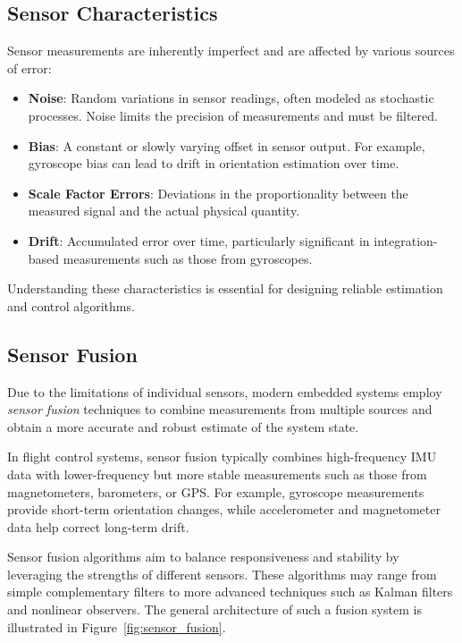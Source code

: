 \subsection{Sensor Characteristics}

Sensor measurements are inherently imperfect and are affected by various sources of error:

\begin{itemize}
    \item \textbf{Noise}:  
    Random variations in sensor readings, often modeled as stochastic processes. Noise limits the precision of measurements and must be filtered.

    \item \textbf{Bias}:  
    A constant or slowly varying offset in sensor output. For example, gyroscope bias can lead to drift in orientation estimation over time.

    \item \textbf{Scale Factor Errors}:  
    Deviations in the proportionality between the measured signal and the actual physical quantity.

    \item \textbf{Drift}:  
    Accumulated error over time, particularly significant in integration-based measurements such as those from gyroscopes.

\end{itemize}

Understanding these characteristics is essential for designing reliable estimation and control algorithms.

\subsection{Sensor Fusion}

Due to the limitations of individual sensors, modern embedded systems employ \textit{sensor fusion} techniques to combine measurements from multiple sources and obtain a more accurate and robust estimate of the system state.

In flight control systems, sensor fusion typically combines high-frequency IMU data with lower-frequency but more stable measurements such as those from magnetometers, barometers, or GPS. For example, gyroscope measurements provide short-term orientation changes, while accelerometer and magnetometer data help correct long-term drift.

Sensor fusion algorithms aim to balance responsiveness and stability by leveraging the strengths of different sensors. These algorithms may range from simple complementary filters to more advanced techniques such as Kalman filters and nonlinear observers. The general architecture of such a fusion system is illustrated in Figure~\ref{fig:sensor_fusion}.

